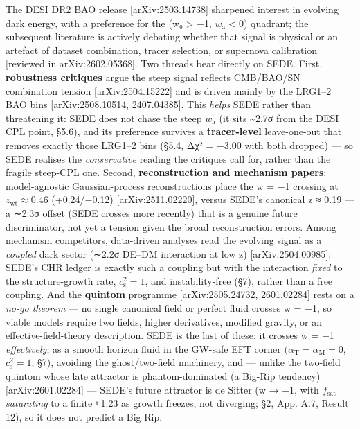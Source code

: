 \documentclass[
  10pt,
]{article}
\begin{document}
The DESI DR2 BAO release {[}arXiv:2503.14738{]} sharpened interest in
evolving dark energy, with a preference for the (w₀ \textgreater{} −1,
\(w_{\mathrm{a}} < 0\)) quadrant; the subsequent literature is actively
debating whether that signal is physical or an artefact of dataset
combination, tracer selection, or supernova calibration {[}reviewed in
arXiv:2602.05368{]}. Two threads bear directly on SEDE. First,
\textbf{robustness critiques} argue the steep signal reflects CMB/BAO/SN
combination tension {[}arXiv:2504.15222{]} and is driven mainly by the
LRG1--2 BAO bins {[}arXiv:2508.10514, 2407.04385{]}. This \emph{helps}
SEDE rather than threatening it: SEDE does not chase the steep
\(w_{\mathrm{a}}\) (it sits \textasciitilde2.7σ from the DESI CPL point,
§5.6), and its preference survives a \textbf{tracer-level} leave-one-out
that removes exactly those LRG1--2 bins (§5.4, Δχ² = −3.00 with both
dropped) --- so SEDE realises the \emph{conservative} reading the
critiques call for, rather than the fragile steep-CPL one. Second,
\textbf{reconstruction and mechanism papers}: model-agnostic
Gaussian-process reconstructions place the w = −1 crossing at
\(z_{\mathrm{wt}} \approx  0.46\) (+0.24/−0.12) {[}arXiv:2511.02220{]},
versus SEDE's canonical z ≈ 0.19 --- a ∼2.3σ offset (SEDE crosses more
recently) that is a genuine future discriminator, not yet a tension
given the broad reconstruction errors. Among mechanism competitors,
data-driven analyses read the evolving signal as a \emph{coupled} dark
sector (∼2.2σ DE--DM interaction at low z) {[}arXiv:2504.00985{]};
SEDE's CHR ledger is exactly such a coupling but with the interaction
\emph{fixed} to the structure-growth rate, \(c_{\mathrm{s}}^{2} = 1\),
and instability-free (§7), rather than a free coupling. And the
\textbf{quintom} programme {[}arXiv:2505.24732, 2601.02284{]} rests on a
\emph{no-go theorem} --- no single canonical field or perfect fluid
crosses w = −1, so viable models require two fields, higher derivatives,
modified gravity, or an effective-field-theory description. SEDE is the
last of these: it crosses w = −1 \emph{effectively}, as a smooth horizon
fluid in the GW-safe EFT corner
\((\alpha _{\mathrm{T}} = \alpha _{\mathrm{M}} = 0\),
\(c_{\mathrm{s}}^{2} = 1\); §7), avoiding the ghost/two-field machinery,
and --- unlike the two-field quintom whose late attractor is
phantom-dominated (a Big-Rip tendency) {[}arXiv:2601.02284{]} --- SEDE's
future attractor is de Sitter (w → −1, with \(f_{\mathrm{sat}}\)
\emph{saturating} to a finite ≈1.23 as growth freezes, not diverging;
§2, App. A.7, Result 12), so it does not predict a Big Rip.
\end{document}
